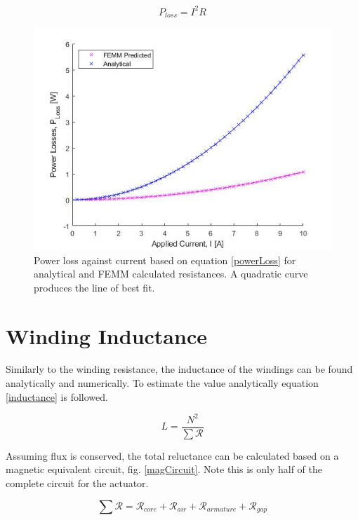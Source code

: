 \documentclass[a4paper]{IEEEtran}
\begin{document}
    \begin{equation}
        P_{loss} = I^2 R
        \label{powerLoss}
    \end{equation}
    
    \begin{figure}[ht]
        \includegraphics[width = \linewidth]{ResistanceWindingLoss.jpg}
        \caption{Power loss against current based on equation \ref{powerLoss} for analytical and FEMM calculated resistances. A quadratic curve produces the line of best fit.}
        \label{windingLoss} 
    \end{figure}

\section{Winding Inductance}
    Similarly to the winding resistance, the inductance of the windings can be found analytically and numerically. To estimate the value analytically equation \ref{inductance} is followed. 

    \begin{equation}
        L = \frac{N^2}{\sum{\mathcal{R}}}
        \label{inductance}
    \end{equation}

    Assuming flux is conserved, the total reluctance can be calculated based on a magnetic equivalent circuit, fig. \ref{magCircuit}. Note this is only half of the complete circuit for the actuator.

    

    \begin{equation}
        \sum{\mathcal{R}} = \mathcal{R}_{core} + \mathcal{R}_{air} + \mathcal{R}_{armature} + \mathcal{R}_{gap}
        \label{summm}
    \end{equation}
\end{document}
